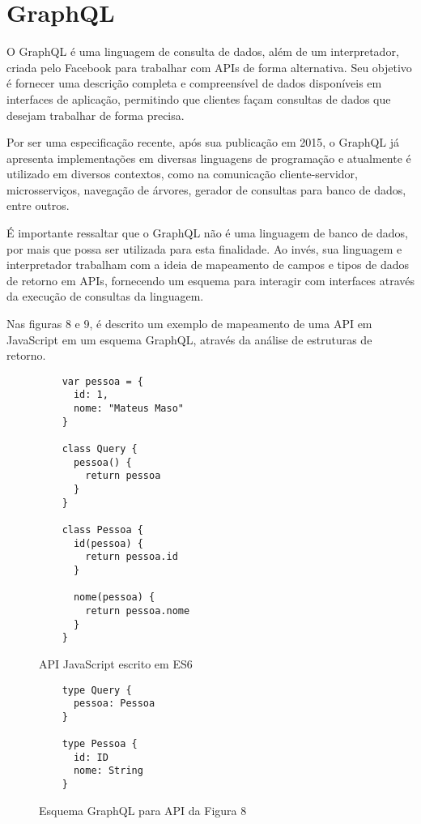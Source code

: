\chapter{GraphQL}

O GraphQL é uma linguagem de consulta de dados, além de um interpretador, criada pelo Facebook para trabalhar com APIs de forma alternativa. Seu objetivo é fornecer uma descrição completa e compreensível de dados disponíveis em interfaces de aplicação, permitindo que clientes façam consultas de dados que desejam trabalhar de forma precisa. \cite{Facebook2016}

Por ser uma especificação recente, após sua publicação em 2015, o GraphQL já apresenta implementações em diversas linguagens de programação e atualmente é utilizado em diversos contextos, como na comunicação cliente-servidor, microsserviços, navegação de árvores, gerador de consultas para banco de dados, entre outros.

É importante ressaltar que o GraphQL não é uma linguagem de banco de dados, por mais que possa ser utilizada para esta finalidade. Ao invés, sua linguagem e interpretador trabalham com a ideia de mapeamento de campos e tipos de dados de retorno em APIs, fornecendo um esquema para interagir com interfaces através da execução de consultas da linguagem. \cite{Facebook2016}

Nas figuras 8 e 9, é descrito um exemplo de mapeamento de uma API em JavaScript em um esquema GraphQL, através da análise de estruturas de retorno.

\begin{figure}[H]
  \centering
  \begin{verbatim}
    var pessoa = {
      id: 1,
      nome: "Mateus Maso"
    }

    class Query {
      pessoa() {
        return pessoa
      }
    }

    class Pessoa {
      id(pessoa) {
        return pessoa.id
      }

      nome(pessoa) {
        return pessoa.nome
      }
    }
  \end{verbatim}
  \caption{API JavaScript escrito em ES6}
\end{figure}

\begin{figure}[H]
  \centering
  \begin{verbatim}
    type Query {
      pessoa: Pessoa
    }

    type Pessoa {
      id: ID
      nome: String
    }
  \end{verbatim}
  \caption{Esquema GraphQL para API da Figura 8}
\end{figure}

